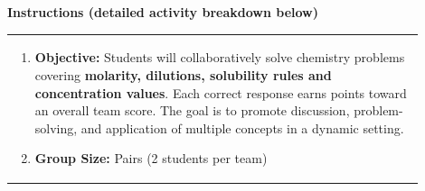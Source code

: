 \documentclass{article}
\begin{document}
\vspace{0.5cm}
\noindent
{\large \textbf{Instructions (detailed activity breakdown below)}} \\

\begin{tabular}{|p{0.9\linewidth}|}
\hline
\begin{minipage}[t]{\linewidth}
\begin{enumerate}
    \item \textbf{Objective:} Students will collaboratively solve chemistry problems covering \textbf{molarity, dilutions, solubility rules and concentration values}. Each correct response earns points toward an overall team score. The goal is to promote discussion, problem-solving, and application of multiple concepts in a dynamic setting.

    \item \textbf{Group Size:} Pairs (2 students per team)


\end{enumerate}
\end{minipage}
\end{tabular}
\end{document}

